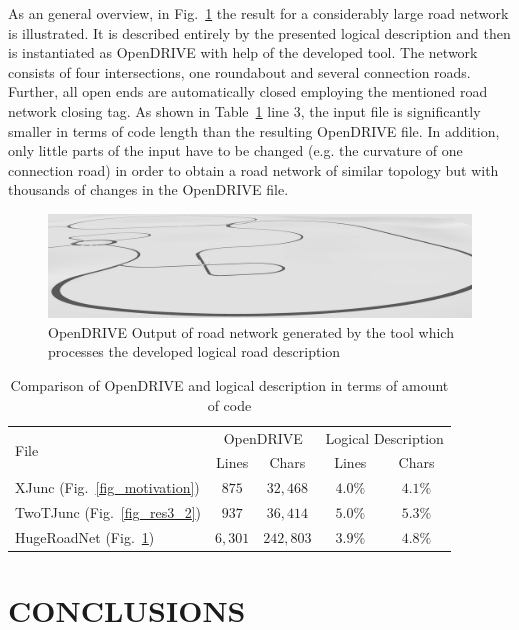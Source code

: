 \documentclass[a4paper, 10pt, conference]{ieeeconf}      %
\begin{document}
As an general overview, in Fig.~\ref{fig_resHuge} the result for a considerably large road network is illustrated. It  is described entirely by the presented logical description and then is instantiated as OpenDRIVE with help of the developed tool. The network consists of four intersections, one roundabout and several connection roads. Further, all open ends are automatically closed employing the mentioned road network closing tag. As shown in Table~\ref{tab_comparison} line 3, the input file is significantly smaller in terms of code length than the resulting OpenDRIVE file. In addition, only little parts of the input have to be changed (e.g. the curvature of one connection road) in order to obtain a road network of similar topology but with thousands of changes in the OpenDRIVE file.
\begin{figure}[thpb]
	\includegraphics[width=\textwidth]{fig/res_huge.PNG}
	\caption{OpenDRIVE Output of road network generated by the tool which processes the developed logical road description}
	\label{fig_resHuge}
\end{figure}
\begin{table}[h]
\caption{Comparison of OpenDRIVE and logical description in terms of amount of code}
\label{tab_comparison}
\def\arraystretch{1.5}
\begin{center}
\begin{tabular}{l|cccc}
\multirow{2}{*}{File} & \multicolumn{2}{c}{OpenDRIVE} & \multicolumn{2}{c}{Logical Description}\\
& Lines & Chars & Lines & Chars \\
\hline
XJunc (Fig.~\ref{fig_motivation}) & $875$ & $32,468$& $4.0\%$ &$4.1\%$\\
TwoTJunc (Fig.~\ref{fig_res3_2}) & $937$ & $36,414$& $5.0\%$ &$5.3\%$\\
HugeRoadNet (Fig.~\ref{fig_resHuge}) & $6,301$ & $242,803$& $3.9\%$ &$4.8\%$
\end{tabular}
\end{center}
\end{table}

\section{CONCLUSIONS} %
\end{document}

